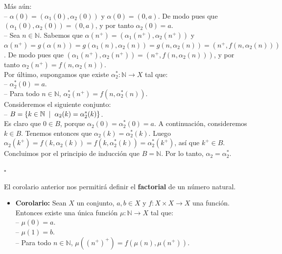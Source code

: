 \documentclass[10 pt]{article}
\begin{document}
{ Más aún: \\

 -- $\alpha(0)=(\alpha_1(0),\alpha_2(0))$ y $\alpha(0)=(0,a)$. De modo pues que $(\alpha_1(0),\alpha_2(0))=(0,a)$, y por tanto $\alpha_2(0)=a$. \\

 -- Sea $n \in \mathbb N$. Sabemos que $\alpha(n^+)=(\alpha_1(n^+ ),\alpha_2(n^+))$ y $\alpha(n^+)=g(\alpha(n))=g(\alpha_1(n),\alpha_2(n))=g(n,\alpha_2(n))=(n^+,f(n,\alpha_2(n)))$. De modo pues que $(\alpha_1(n^+),\alpha_2(n^+))=(n^+,f(n,\alpha_2(n)))$, y por tanto $\alpha_2(n^+)=f(n,\alpha_2(n))$. \\

 Por último, supongamos que existe $\alpha_2^*:\mathbb N \rightarrow X$ tal que: \\

 -- $\alpha_2^*(0)=a$. \\

 -- Para todo $n \in \mathbb N$, $\alpha_2^*(n^+)=f(n,\alpha_2^*(n))$. \\

 Consideremos el siguiente conjunto: \\

 -- $B=\{k \in \mathbb N \hspace{0.2 cm}|\hspace{0.2 cm}\alpha_2(k)=\alpha_2^*(k)\}$. \\

Es claro que $0 \in B$, porque $\alpha_2(0)=\alpha_2^*(0)=a$. A continuación, consideremos $k \in B$. Tenemos entonces que $\alpha_2(k)=\alpha_2^*(k)$. Luego $\alpha_2(k^+)=f(k,\alpha_2(k))=f(k,\alpha_2^*(k))=\alpha_2^*(k^+)$, así que $k^+ \in B$. Concluimos por el principio de inducción que $B=\mathbb N$. Por lo tanto, $\alpha_2=\alpha_2^*$.} \\

\begin{flushright}
    $\square$
\end{flushright}

\Large{El corolario anterior nos permitirá definir el \textbf{factorial} de un número natural.} \\

\begin{itemize}
    \item \Large{\textbf{Corolario:} Sean $X$ un conjunto, $a,b \in X$ y $f:X \times X \rightarrow X$ una función. Entonces existe una única función $\mu:\mathbb N \rightarrow X$ tal que: \\

    -- $\mu(0)=a$. \\

    -- $\mu(1)=b$. \\

    -- Para todo $n \in \mathbb N$, $\mu((n^+)^+)=f(\mu(n),\mu(n^+))$.}\\
\end{itemize}
\end{document}
